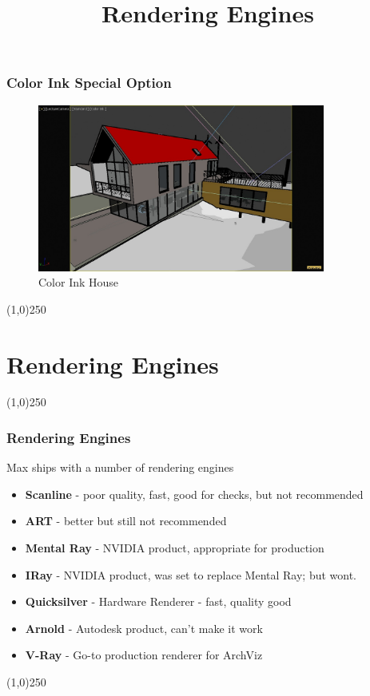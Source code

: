 \begin{frame}
\frametitle{Color Ink Special Option}
\begin{figure}
	\centering
	\includegraphics[height=5.5cm]{img/ViewportOptions/ColorInkHouse.jpg}
	\caption{Color Ink House}
	\label{fig:ColorInkHouse}
\end{figure}
\end{frame}
\begin{center}\line(1,0){250}\end{center}










\section{Rendering Engines}
\begin{frame}
\title[Rendering Engines]{Rendering Engines}
\titlepage
\end{frame}\begin{center}\line(1,0){250}\end{center}

\begin{frame}
\frametitle{Rendering Engines}
Max ships with a number of rendering engines
\begin{itemize}
	\item \textbf{Scanline} - poor quality, fast, good for checks, but not recommended
	\item \textbf{ART} - better but still not recommended
	\item \textbf{Mental Ray} - NVIDIA product, appropriate for production
	\item \textbf{IRay} - NVIDIA product, was set to replace Mental Ray; but wont.
	\item \textbf{Quicksilver} - Hardware Renderer - fast, quality good
	\item \textbf{Arnold} - Autodesk product, can't make it work
	\item \textbf{V-Ray} - Go-to production renderer for ArchViz
\end{itemize}
\end{frame}
\begin{center}\line(1,0){250}\end{center}



